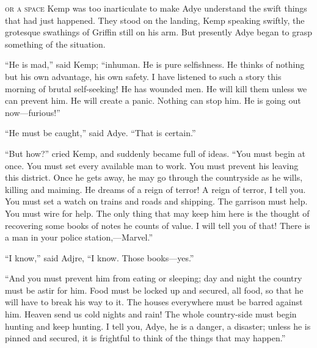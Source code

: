 \label{ch:25}
\begin{ChapterStart}
\vspace*{2\nbs}

\vspace{1.5\nbs}
\vspace{0.75\nbs}
\end{ChapterStart}

\kern-4pt\textsc{or a space} Kemp was too inarticulate to make Adye understand the swift things that had just happened. They stood on the landing, Kemp speaking swiftly, the grotesque swathings of Griffin still on his arm. But presently Adye began to grasp something of the situation.

“He is mad,” said Kemp; “inhuman. He is pure selfishness. He thinks of nothing but his own advantage, his own safety. I have listened to such a story this morning of brutal self-seeking! He has wounded men. He will kill them unless we can prevent him. He will create a panic. Nothing can stop him. He is going out now—furious!”

“He must be caught,” said Adye. “That is certain.”

“But how?” cried Kemp, and suddenly became full of ideas. “You must begin at once. You must set every available man to work. You must prevent his leaving this district. Once he gets away, he may go through the countryside as he wills, killing and maiming. He dreams of a reign of terror! A reign of terror, I tell you. You must set a watch on trains and roads and shipping. The garrison must help. You must wire for help. The only thing that may keep him here is the thought of recovering some books of notes he counts of value. I will tell you of that! There is a man in your police station,—Marvel.”

“I know,” said Adjre, “I know. Those books—yes.”

“And you must prevent him from eating or sleeping; day and night the country must be astir for him. Food must be locked up and secured, all food, so that he will have to break his way to it. The houses everywhere must be barred against him. Heaven send us cold nights and rain! The whole country-side must begin hunting and keep hunting. I tell you, Adye, he is a danger, a disaster; unless he is pinned and secured, it is frightful to think of the things that may happen.”

